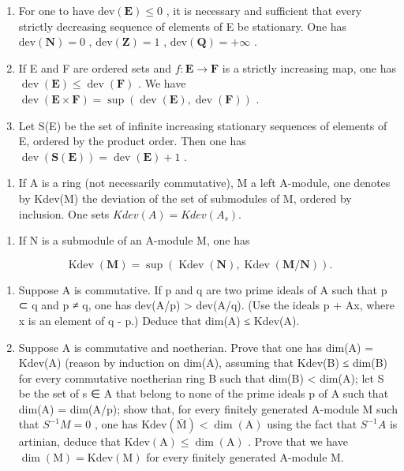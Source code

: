 \begin{enumerate}
\def\labelenumi{\alph{enumi})}
\setcounter{enumi}{1}
\item
  For one to have \(\text{dev}(\mathbf{E}) \leqslant 0\) , it is necessary and sufficient that every strictly decreasing sequence of elements of E be stationary. One has \(\text{dev}(\mathbf{N}) = 0\) , \(\text{dev}(\mathbf{Z}) = 1\) , \(\text{dev}(\mathbf{Q}) = +\infty\) .
\item
  If E and F are ordered sets and \(f: \mathbf{E} \to \mathbf{F}\) is a strictly increasing map, one has \(\operatorname{dev}(\mathbf{E}) \leqslant \operatorname{dev}(\mathbf{F})\) . We have \(\operatorname{dev}(\mathbf{E} \times \mathbf{F}) = \sup(\operatorname{dev}(\mathbf{E}), \operatorname{dev}(\mathbf{F}))\) .
\item
  Let S(E) be the set of infinite increasing stationary sequences of elements of E, ordered by the product order. Then one has \(\operatorname{dev}(\mathbf{S}(\mathbf{E})) = \operatorname{dev}(\mathbf{E}) + 1\) .
\end{enumerate}

\begin{enumerate}
\def\labelenumi{\arabic{enumi})}
\setcounter{enumi}{4}
\tightlist
\item
  If A is a ring (not necessarily commutative), M a left A-module, one denotes by Kdev(M) the deviation of the set of submodules of M, ordered by inclusion. One sets \(Kdev(A) = Kdev(A_s)\).
\end{enumerate}

\begin{enumerate}
\def\labelenumi{\alph{enumi})}
\tightlist
\item
  If N is a submodule of an A-module M, one has
\end{enumerate}

\[
\operatorname{Kdev} (\mathbf {M}) = \sup (\operatorname{Kdev} (\mathbf {N}), \operatorname{Kdev} (\mathbf {M} / \mathbf {N}))  .
\]

\begin{enumerate}
\def\labelenumi{\alph{enumi})}
\setcounter{enumi}{1}
\item
  Suppose A is commutative. If p and q are two prime ideals of A such that p ⊂ q and p ≠ q, one has dev(A/p) \textgreater{} dev(A/q). (Use the ideals p + Ax, where x is an element of q - p.) Deduce that dim(A) ≤ Kdev(A).
\item
  Suppose A is commutative and noetherian. Prove that one has dim(A) = Kdev(A) (reason by induction on dim(A), assuming that Kdev(B) ≤ dim(B) for every commutative noetherian ring B such that dim(B) \textless{} dim(A); let S be the set of s ∈ A that belong to none of the prime ideals p of A such that dim(A) = dim(A/p); show that, for every finitely generated A-module M such that \(S^{-1}M = 0\) , one has \(\mathrm{Kdev}(\bar{\mathrm{M}}) < \dim(\mathrm{A})\) using the fact that \(S^{-1}A\) is artinian, deduce that \(\mathrm{Kdev}(\mathrm{A}) \leqslant \dim(\mathrm{A})\) . Prove that we have \(\dim(\mathrm{M}) = \mathrm{Kdev}(\mathrm{M})\) for every finitely generated A-module M.
\end{enumerate}

